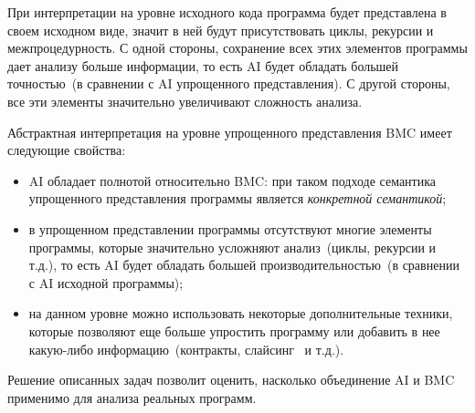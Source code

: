 При интерпретации на уровне исходного кода программа будет представлена в своем
исходном виде, значит в ней будут присутствовать циклы, рекурсии и 
межпроцедурность. С одной стороны, сохранение всех этих элементов программы 
дает анализу больше информации, то есть AI будет обладать большей точностью~(в
сравнении с AI упрощенного представления). С 
другой стороны, все эти элементы значительно увеличивают сложность анализа.

Абстрактная интерпретация на уровне упрощенного представления BMC имеет 
следующие свойства:
\begin{itemize}
\item AI обладает полнотой относительно BMC: при таком подходе семантика
упрощенного представления программы является \emph{конкретной семантикой};
\item в упрощенном представлении программы отсутствуют многие элементы 
программы, которые значительно усложняют анализ~(циклы, рекурсии и т.д.), то 
есть AI будет обладать большей производительностью~(в сравнении с AI исходной 
программы);
\item на данном уровне можно использовать некоторые дополнительные техники,
которые позволяют еще больше упростить программу или добавить в нее какую-либо
информацию~(контракты, слайсинг~\cite{slicing} и т.д.).
\end{itemize}

Решение описанных задач позволит оценить, насколько объединение AI и BMC 
применимо для анализа реальных программ.


